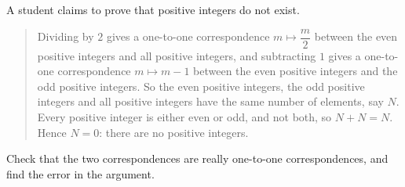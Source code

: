 A student claims to prove that positive integers do not exist.
\begin{quote}
Dividing by $2$ gives a one-to-one correspondence $m\mapsto\dfrac {m}{2}$ between the even positive integers and all positive integers, and subtracting $1$ gives a one-to-one correspondence $m\mapsto m-1$ between the even positive integers and the odd positive integers. So the even positive integers, the odd positive integers and all positive integers have the same number of elements, say $N$. Every positive integer is either even or odd, and not both, so $N+N=N$. Hence $N=0$: there are no positive integers.
\end{quote}
Check that the two correspondences are really one-to-one correspondences, and find the error in the argument.
